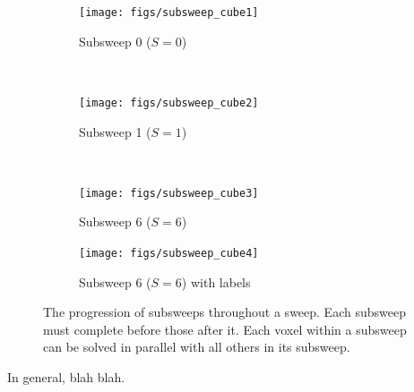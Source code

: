 \begin{figure}
    \centering
    \begin{subfigure}[b]{0.45\textwidth}
        \texttt{[image: figs/subsweep\_cube1]}
        \caption{Subsweep 0 ($S=0$)}
        \label{fig:subsweep_cube1}
    \end{subfigure}
    ~ %
    \begin{subfigure}[b]{0.45\textwidth}
        \texttt{[image: figs/subsweep\_cube2]}
        \caption{Subsweep 1 ($S=1$)}
        \label{fig:subsweep_cube2}
    \end{subfigure}
    ~ %
    \begin{subfigure}[b]{0.45\textwidth}
        \texttt{[image: figs/subsweep\_cube3]}
        \caption{Subsweep 6 ($S=6$)}
        \label{fig:subsweep_cube3}
    \end{subfigure}
    \begin{subfigure}[b]{0.45\textwidth}
        \texttt{[image: figs/subsweep\_cube4]}
        \caption{Subsweep 6 ($S=6$) with labels}
        \label{fig:subsweep_cube4}
    \end{subfigure}
    \caption{The progression of subsweeps throughout a sweep. Each subsweep must complete before those after it. Each voxel within a subsweep can be solved in parallel with all others in its subsweep.}\label{fig:subsweep_cube}
\end{figure}

In general, blah blah.

